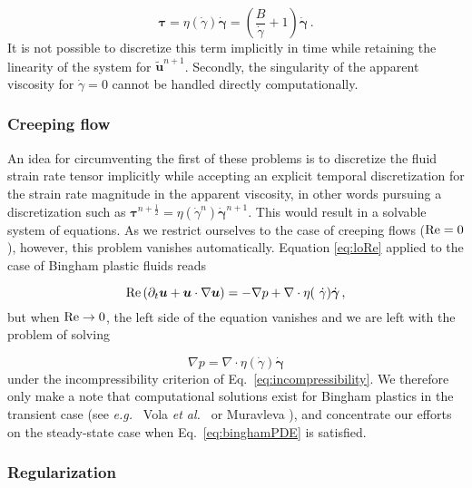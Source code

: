 \documentclass[final,3p,twocolumn]{elsarticle}
\begin{document}
\begin{equation} 
    \bm{\tau} = \eta(\dot{\gamma}) \bm{\dot{\gamma}} = \left(
    \frac{B}{\dot{\gamma}} + 1 \right) \dot{\bm{\gamma}} \,.
    \label{eq:binghamStress}
\end{equation}
%
It is not possible to discretize this term implicitly in time while retaining
the linearity of the system for $\tilde{\bm{u}}^{n+1}$. Secondly, the
singularity of the apparent viscosity for $\dot{\gamma}=0$ cannot be handled
directly computationally. 

\subsubsection{Creeping flow}

An idea for circumventing the first of these problems is to discretize the
fluid strain rate tensor implicitly while accepting an explicit temporal
discretization for the strain rate magnitude in the apparent viscosity, in
other words pursuing a discretization such as $\bm{\tau}^{n+\frac{1}{2}} =
\eta(\dot{\gamma}^{n}) \dot{\bm{\gamma}}^{n+1}$. This would result in a
solvable system of equations. As we restrict ourselves to the case of creeping
flows (${\rm Re}=0$), however, this problem vanishes automatically. Equation
\eqref{eq:loRe} applied to the case of Bingham plastic fluids reads 

\begin{equation}
    {\rm Re} \left( \partial_t \bm{u} + \bm{u} \cdot \nabla \bm{u} \right)  = -
    \nabla p + \nabla \cdot \eta ( \dot{\gamma} ) \dot{\bm{\gamma}} \,,
\end{equation}
%
but when ${\rm Re} \rightarrow 0$, the left side of the equation vanishes and we are left
with the problem of solving 

\begin{equation}
    \nabla p = \nabla \cdot \eta ( \dot{\gamma} ) \dot{\bm{\gamma}} 
    \label{eq:binghamPDE}
\end{equation}
%
under the incompressibility criterion of Eq.\ \eqref{eq:incompressibility}. We
therefore only make a note that computational solutions exist for Bingham
plastics in the transient case (see {\em e.g.\ } Vola {\em et al.\ }
\cite{vola2003laminar} or Muravleva \cite{muravleva2015uzawa}), and concentrate
our efforts on the steady-state case when Eq.\ \eqref{eq:binghamPDE} is
satisfied.

\subsubsection{Regularization}
\end{document}
